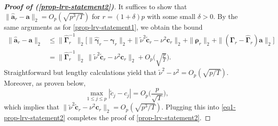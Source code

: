 \begin{proof}[\textnormal{\textbf{Proof of (\ref{prop-lrv-statement2})}}] 
It suffices to show that $\| \widehat{\boldsymbol{a}}_r - \boldsymbol{a} \|_2 = O_p(\sqrt{p^3/T})$ for $r = (1+\delta) p$ with some small $\delta > 0$. By the same arguments as for \eqref{prop-lrv-statement1}, we obtain the bound
\begin{align}
\| \widehat{\boldsymbol{a}}_r - \boldsymbol{a} \|_2 
 & \le \| \widehat{\boldsymbol{\Gamma}}_r^{-1} \|_2 \Big[ \| \widehat{\boldsymbol{\gamma}}_r - \boldsymbol{\gamma}_r \|_2 + \| \widetilde{\nu}^2 \widetilde{\boldsymbol{c}}_r - \nu^2 \boldsymbol{c}_r \|_2 + \| \boldsymbol{\rho}_r \|_2 + \| (\boldsymbol{\Gamma}_r - \widehat{\boldsymbol{\Gamma}}_r) \boldsymbol{a} \|_2 \Big] \nonumber \\
 & = \| \widehat{\boldsymbol{\Gamma}}_r^{-1} \|_2 \, \| \widetilde{\nu}^2 \widetilde{\boldsymbol{c}}_r - \nu^2 \boldsymbol{c}_r \|_2 + O_p\Big(\sqrt{\frac{p}{T}}\Big). \label{eq1-prop-lrv-statement2}
\end{align}
Straightforward but lengthy calculations yield that $\widetilde{\nu}^2 - \nu^2 = O_p(\sqrt{p/T})$. Moreover, as proven below, 
\begin{equation}\label{eq2-prop-lrv-statement2}
\max_{1 \le j \le p} | \widetilde{c}_j - c_j | = O_p\Big( \frac{p}{\sqrt{T}} \Big), 
\end{equation}
which implies that $\| \widetilde{\nu}^2 \widetilde{\boldsymbol{c}}_r - \nu^2 \boldsymbol{c}_r \|_2 = O_p(\sqrt{p^3/T})$. Plugging this into \eqref{eq1-prop-lrv-statement2} completes the proof of \eqref{prop-lrv-statement2}. 



\end{proof}

